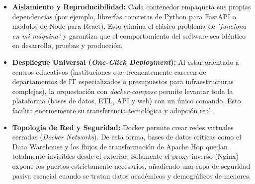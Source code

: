 \begin{itemize}
    \item \textbf{Aislamiento y Reproducibilidad:} Cada contenedor empaqueta sus propias dependencias (por ejemplo, librerías concretas de Python para FastAPI o módulos de Node para React). Esto elimina el clásico problema de \textit{"funciona en mi máquina"} y garantiza que el comportamiento del software sea idéntico en desarrollo, pruebas y producción.
    \item \textbf{Despliegue Universal (\textit{One-Click Deployment}):} Al estar orientado a centros educativos (instituciones que frecuentemente carecen de departamentos de IT especializados o presupuestos para infraestructuras complejas), la orquestación con \textit{docker-compose} permite levantar toda la plataforma (bases de datos, ETL, API y web) con un único comando. Esto facilita enormemente su transferencia tecnológica y adopción real.
    \item \textbf{Topología de Red y Seguridad:} Docker permite crear redes virtuales cerradas (\textit{Docker Networks}). De esta forma, bases de datos críticas como el Data Warehouse y los flujos de transformación de Apache Hop quedan totalmente invisibles desde el exterior. Solamente el proxy inverso (Nginx) expone los puertos estrictamente necesarios, añadiendo una capa de seguridad pasiva esencial cuando se tratan datos académicos y demográficos de menores.
\end{itemize}
